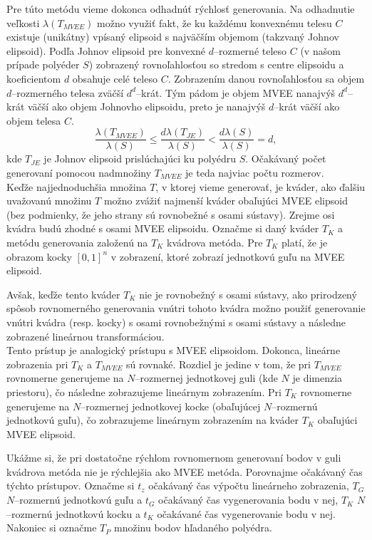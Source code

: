 Pre túto metódu vieme dokonca odhadnúť rýchlosť generovania. Na odhadnutie veľkosti $\lambda(T_{MVEE})$ možno využiť fakt, že ku každému konvexnému telesu $C$ existuje (unikátny) vpísaný elipsoid s najväčším objemom (takzvaný Johnov elipsoid). Podľa \cite{ellipsoids_ball} Johnov elipsoid pre konvexné $d$--rozmerné teleso $C$ (v našom prípade polyéder $S$) zobrazený rovnoľahlosťou so stredom s centre elipsoidu a koeficientom $d$ obsahuje celé teleso $C$. Zobrazením danou rovnoľahlosťou sa objem $d$--rozmerného telesa zväčší $d^d$--krát. Tým pádom je objem MVEE nanajvýš $d^d$--krát väčší ako objem Johnovho elipsoidu, preto je nanajvýš $d$--krát väčší ako objem telesa $C$.
$$\frac {\lambda(T_{MVEE})}{\lambda(S)} \leq \frac{d\lambda(T_{JE})}{\lambda(S)} < \frac{d\lambda(S)}{\lambda(S)}=d,$$ kde $T_{JE}$ je Johnov elipsoid prislúchajúci ku polyédru $S$. Očakávaný počet generovaní pomocou nadmnožiny $T_{MVEE}$ je teda najviac počtu rozmerov.\\

Keďže najjednoduchšia množina $T$, v ktorej vieme generovať, je kváder, ako ďalšiu uvažovanú množinu $T$ možno zvážiť najmenší kváder obaľujúci MVEE elipsoid (bez podmienky, že jeho strany sú rovnobežné s osami sústavy). Zrejme osi kvádra budú zhodné s osami MVEE elipsoidu. Označme si daný kváder $T_K$ a metódu generovania založenú na $T_K$ kvádrova metóda. Pre $T_K$ platí, že je obrazom kocky $[0,1]^n$ v zobrazení, ktoré zobrazí jednotkovú guľu na MVEE elipsoid.

Avšak, keďže tento kváder $T_K$ nie je rovnobežný s osami sústavy, ako prirodzený spôsob rovnomerného generovania vnútri tohoto kvádra možno použiť generovanie vnútri kvádra (resp. kocky) s osami rovnobežnými s osami sústavy a následne zobrazené lineárnou transformáciou.\\

Tento prístup je analogický prístupu s MVEE elipsoidom. Dokonca, lineárne zobrazenia pri $T_K$ a $T_{MVEE}$ sú rovnaké. Rozdiel je jedine v tom, že pri $T_{MVEE}$ rovnomerne generujeme na $N$--rozmernej jednotkovej guli (kde $N$ je dimenzia priestoru), čo následne zobrazujeme lineárnym zobrazením. Pri $T_K$ rovnomerne generujeme na $N$--rozmernej jednotkovej kocke (obaľujúcej $N$--rozmernú jednotkovú guľu), čo zobrazujeme lineárnym zobrazením na kváder $T_K$ obaľujúci MVEE elipsoid.

Ukážme si, že pri dostatočne rýchlom rovnomernom generovaní bodov v guli kvádrova metóda nie je rýchlejšia ako MVEE metóda. Porovnajme očakávaný čas týchto prístupov. Označme si $t_z$ očakávaný čas výpočtu lineárneho zobrazenia, $T_G$ $N$--rozmernú jednotkovú guľu a $t_G$ očakávaný čas vygenerovania bodu v nej, $T_K$ $N$--rozmernú jednotkovú kocku a $t_K$ očakávané čas vygenerovanie bodu v nej. Nakoniec si označme $T_P$ množinu bodov hľadaného polyédra.

